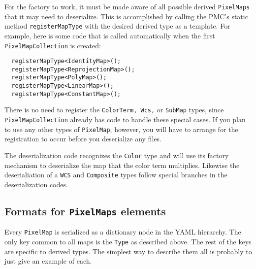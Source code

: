 \documentclass[11pt,preprint,flushrt]{aastex}
\begin{document}
For the factory to work, it must be made aware of all possible derived \texttt{PixelMaps} that it may need to deserialize.  This is accomplished by calling the PMC's static method \texttt{registerMapType} with the desired derived type as a template.  For example, here is some code that is called automatically when the first \texttt{PixelMapCollection} is created:
\begin{verbatim}
  registerMapType<IdentityMap>();
  registerMapType<ReprojectionMap>();
  registerMapType<PolyMap>();
  registerMapType<LinearMap>();
  registerMapType<ConstantMap>();
\end{verbatim}
There is no need to register the \texttt{ColorTerm, Wcs,} or \texttt{SubMap} types, since \texttt{PixelMapCollection} already has code to handle these special cases.
If you plan to use any other types of \texttt{PixelMap}, however, you will have to arrange for the registration to occur before you deserialize any files.

The deserialization code recognizes the \texttt{Color} type and will use its factory mechanism to deserialize the map that the color term multiplies.  Likewise the deserialiation of a \texttt{WCS} and \texttt{Composite} types follow special branches in the deserialization codes.

\subsection{Formats for \texttt{PixelMaps} elements}
\label{pixmapserial}
Every \texttt{PixelMap} is serialized as a dictionary node in the YAML hierarchy.  The only key common to all maps is the \texttt{Type} as described above.  The rest of the keys are specific to derived types.  The simplest way to describe them all is probably to just give an example of each.  
\end{document}
